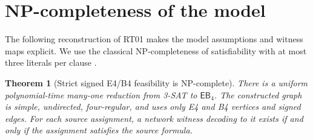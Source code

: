 \documentclass[11pt,letterpaper]{article}
\newtheorem{theorem}{Theorem}[section]
\theoremstyle{definition}
\newcommand{\EB}{\ensuremath{\mathsf{EB}_4}}
\begin{document}
\section{NP-completeness of the model}\label{sec:npc}
The following reconstruction of RT01 \cite{rt01,rt01code} makes the model assumptions and witness maps explicit. We use the classical NP-completeness of satisfiability with at most three literals per clause \cite{karp1972}.
\begin{theorem}[Strict signed E4/B4 feasibility is NP-complete]\label{thm:npc}
There is a uniform polynomial-time many-one reduction from 3-SAT to \(\EB\). The constructed graph is simple, undirected, four-regular, and uses only E4 and B4 vertices and signed edges. For each source assignment, a network witness decoding to it exists if and only if the assignment satisfies the source formula.
\end{theorem}
\end{document}
